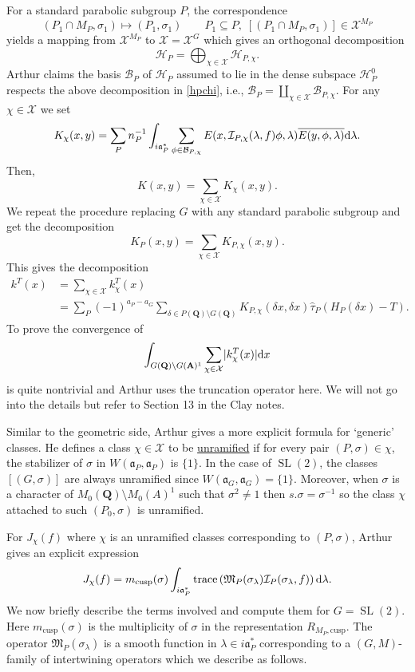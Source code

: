 \documentclass[11pt]{amsart}
\def\apg{a_{P} - a_{G}}
\def\A{\mathbf A}
\def\Q{\mathbf Q}
\def\BBB{\mathcal B}
\def\HHH{\mathcal H}
\def\III{\mathcal I}
\def\MMM{\mathfrak M}	%
\def\XXX{\mathcal X}
\def\aaa{\mathfrak a}
\def\d{\text d}
\def\bs{\setminus}
\def\cusp{\text{cusp}}
\def\mod#1{\lvert #1 \rvert} %
\def\sl{\operatorname{SL}}
\def\trace{\operatorname{trace}}
\theoremstyle{remark}
\begin{document}
For a standard parabolic subgroup $P$, the correspondence
\[ (P_1\cap M_P, \sigma_1) \mapsto (P_1, \sigma_1) \qquad P_1 \subseteq P, \; [(P_1 \cap M_P, \sigma_1)] \in \XXX^{M_P} \]
yields a mapping from $\XXX^{M_P}$ to $\XXX = \XXX^G$ which gives an orthogonal decomposition
\[ \HHH_P = \bigoplus_{\chi \in \XXX} \HHH_{P, \chi}. \]
Arthur claims the basis $\BBB_P$ of $\HHH_P$ assumed to lie in the dense subspace $\HHH_P^0$ respects the above decomposition in \cref{hpchi}, i.e., $\BBB_P = \coprod_{\chi \in \XXX} \BBB_{P, \chi}$. For any $\chi \in \XXX$ we set
\[ K_\chi(x, y) = \sum_P n_P^{-1} \int_{i\aaa_P^*} \sum_{\phi \in \BBB_{P, \chi}}
		E(x, \III_{P, \chi}(\lambda, f)\phi, \lambda) \overline{E(y, \phi, \lambda)} \d \lambda. \]
Then,
\[ K(x, y) = \sum_{\chi \in \XXX} K_\chi(x, y). \]
We repeat the procedure replacing $G$ with any standard parabolic subgroup and get the decomposition 
\[ K_P(x, y) = \sum_{\chi \in \XXX} K_{P, \chi}(x, y). \]
This gives the decomposition
\begin{align*}
	k^T(x) & = \sum_{\chi \in \XXX} k_\chi^T(x) \\
			& = \sum_P (-1)^{\apg} \sum_{\delta \in P(\Q)\bs G(\Q)} K_{P, \chi}(\delta x, \delta x)
				\hat\tau_P(H_P(\delta x) - T).
\end{align*}
To prove the convergence of 
\[ \int_{G(\Q)\bs G(\A)^1} \sum_{\chi \in \XXX} \mod{k_\chi^T (x)} \d x \]
is quite nontrivial and Arthur uses the truncation operator here. We will not go into the details but refer to Section 13 in the Clay notes. 

Similar to the geometric side, Arthur gives a more explicit formula for `generic' classes. He defines a class $\chi \in \XXX$ to be \underline{unramified} if for every pair $(P, \sigma) \in \chi$, the stabilizer of $\sigma$ in $W(\aaa_P, \aaa_P)$ is $\{1\}$. In the case of $\sl(2)$, the classes $[(G, \sigma)]$ are always unramified since $W(\aaa_G, \aaa_G) = \{1\}$. Moreover, when $\sigma$ is a character of $M_0(\Q)\bs M_0(A)^1$ such that $\sigma^2 \neq 1$ then $s.\sigma = \sigma^{-1}$ so the class $\chi$ attached to such $(P_0, \sigma)$ is unramified. 

For $J_\chi(f)$ where $\chi$ is an unramified classes corresponding to $(P, \sigma)$, Arthur gives an explicit expression
\[ J_\chi(f) = m_{\cusp}(\sigma) \int_{i\aaa_P^*} \trace\left(\MMM_P(\sigma_\lambda) \III_P(\sigma_\lambda, f)\right) \d \lambda. \]
We now briefly describe the terms involved and compute them for $G=\sl(2)$. Here $m_{\cusp}(\sigma)$ is the multiplicity of $\sigma$ in the representation $R_{M_P, \cusp}$. The operator $\MMM_P(\sigma_\lambda)$ is a smooth function in $\lambda \in i\aaa_P^*$ corresponding to a $(G, M)$-family of intertwining operators which we describe as follows. 
\end{document}
